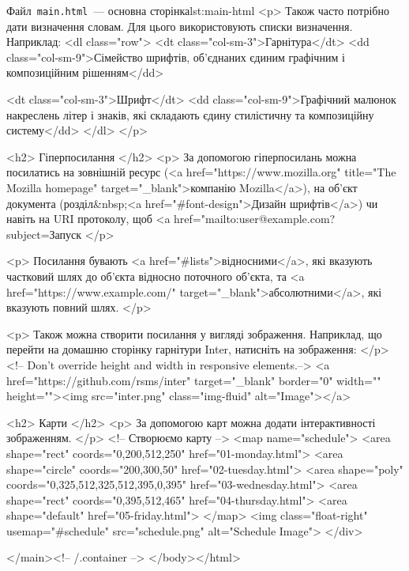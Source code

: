 \documentclass[
  a4paper,
  oneside,
  BCOR = 10mm,
  DIV = 12,
  12pt,
  headings = normal,
]{scrartcl}
\newcommand{\filename}[1]{\texttt{#1}}
\begin{document}
\begin{listinghtml}{Файл~\filename{\textenglish{main.html}}~— основна сторінка}{lst:main-html}
      <p>
        Також часто потрібно дати визначення словам. Для цього використовують списки визначення. Наприклад:
        <dl class="row">
          <dt class="col-sm-3">Гарнітура</dt>
          <dd class="col-sm-9">Сімейство шрифтів, об'єднаних єдиним графічним і композиційним рішенням</dd>

          <dt class="col-sm-3">Шрифт</dt>
          <dd class="col-sm-9">Графічний малюнок накреслень літер і знаків, які складають єдину стилістичну та композиційну систему</dd>
        </dl>
      </p>

    <h2>
      Гіперпосилання
    </h2>
      <p>
      За допомогою гіперпосилань можна посилатись на зовнішній ресурс (<a href="https://www.mozilla.org" title="The Mozilla homepage" target="_blank">компанію Mozilla</a>), на об'єкт документа (розділ&nbsp;<a href="#font-design">Дизайн шрифтів</a>) чи навіть на URI протоколу, щоб <a href="mailto:user@example.com?subject=Запуск%
      </p>

      <p>
      Посилання бувають <a href="#lists">відносними</a>, які вказують частковий шлях до об'єкта відносно поточного об'єкта, та <a href="https://www.example.com/" target="_blank">абсолютними</a>, які вказують повний шлях.
      </p>

      <p>
        Також можна створити посилання у вигляді зображення. Наприклад, що перейти на домашню сторінку гарнітури Inter, натисніть на зображення:
      </p>
      <!-- Don't override height and width in responsive elements.-->
      <a href="https://github.com/rsms/inter" target="_blank" border="0" width="" height=""><img src="inter.png" class="img-fluid" alt="Image"></a>

    <h2>
      Карти
    </h2>
      <p>
        За допомогою карт можна додати інтерактивності зображенням.
      </p>
      <!-- Створюємо карту -->
      <map name="schedule">
        <area shape="rect" coords="0,200,512,250" href="01-monday.html">
        <area shape="circle" coords="200,300,50" href="02-tuesday.html">
        <area shape="poly" coords="0,325,512,325,512,395,0,395" href="03-wednesday.html">
        <area shape="rect" coords="0,395,512,465" href="04-thursday.html">
        <area shape="default" href="05-friday.html">
      </map>
      <img class="float-right" usemap="#schedule" src="schedule.png" alt="Schedule Image">
  </div>

</main><!-- /.container -->
</body></html>
    \end{listinghtml}
\end{document}
